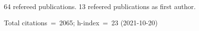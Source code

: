 64 refereed publications. 13 refeered publications as first author.

Total citations~=~2065; h-index~=~23 (2021-10-20)